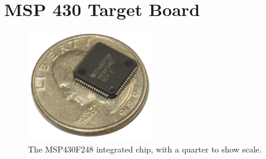 \section{MSP 430 Target Board}
\label{MSP430Target}

\begin{figure}
\begin{center}
\includegraphics[width=0.5\textwidth]{images/QFPFoot.jpg}
\caption{The MSP430F248 integrated chip, with a quarter to show scale.}
\label{Fig:QFPFoot}
\end{center}
\end{figure}

